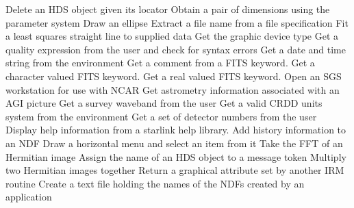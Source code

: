   {Delete an HDS object given its locator}
  {Obtain a pair of dimensions using the parameter system}
  {Draw an ellipse}
  {Extract a file name from a file specification}
  {Fit a least squares straight line to supplied data}
  {Get the graphic device type}
  {Get a quality expression from the user and check for syntax errors}
  {Get a date and time string from the environment}
  {Get a comment from a FITS keyword.}
  {Get a character valued FITS keyword.}
  {Get a real valued FITS keyword.}
  {Open an SGS workstation for use with NCAR}
  {Get astrometry information associated with an AGI picture}
  {Get a survey waveband from the user}
  {Get a valid CRDD units system from the environment}
  {Get a set of detector numbers from the user}
  {Display help information from a starlink help library.}
  {Add history information to an NDF}
  {Draw a horizontal menu and select an item from it}
  {Take the FFT of an Hermitian image}
  {Assign the name of an HDS object to a message token}
  {Multiply two Hermitian images together}
  {Return a graphical attribute set by another IRM routine}
  {Create a text file holding the names of the NDFs created by an application}
